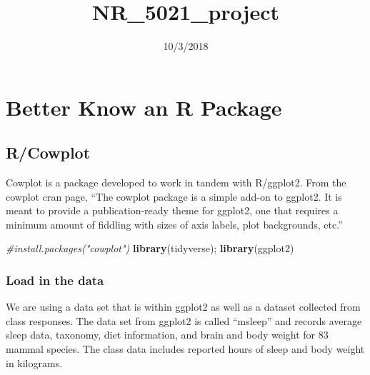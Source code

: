 \documentclass[]{article}
\title{NR\_5021\_project}
\author{}
\date{10/3/2018}
\newenvironment{Shaded}{\begin{snugshade}}{\end{snugshade}}
\newcommand{\KeywordTok}[1]{\textcolor[rgb]{0.13,0.29,0.53}{\textbf{#1}}}
\newcommand{\CommentTok}[1]{\textcolor[rgb]{0.56,0.35,0.01}{\textit{#1}}}
\newcommand{\NormalTok}[1]{#1}
\begin{document}
\maketitle

\section{Better Know an R Package}\label{better-know-an-r-package}

\subsection{R/Cowplot}\label{rcowplot}

Cowplot is a package developed to work in tandem with R/ggplot2. From
the cowplot cran page, ``The cowplot package is a simple add-on to
ggplot2. It is meant to provide a publication-ready theme for ggplot2,
one that requires a minimum amount of fiddling with sizes of axis
labels, plot backgrounds, etc.''

\begin{Shaded}
\begin{Highlighting}[]
\CommentTok{#install.packages("cowplot")}
\KeywordTok{library}\NormalTok{(tidyverse); }\KeywordTok{library}\NormalTok{(ggplot2)}
\end{Highlighting}
\end{Shaded}

\subsubsection{Load in the data}\label{load-in-the-data}

We are using a data set that is within ggplot2 as well as a dataset
collected from class responses. The data set from ggplot2 is called
``msleep'' and records average sleep data, taxonomy, diet information,
and brain and body weight for 83 mammal species. The class data includes
reported hours of sleep and body weight in kilograms.
\end{document}
